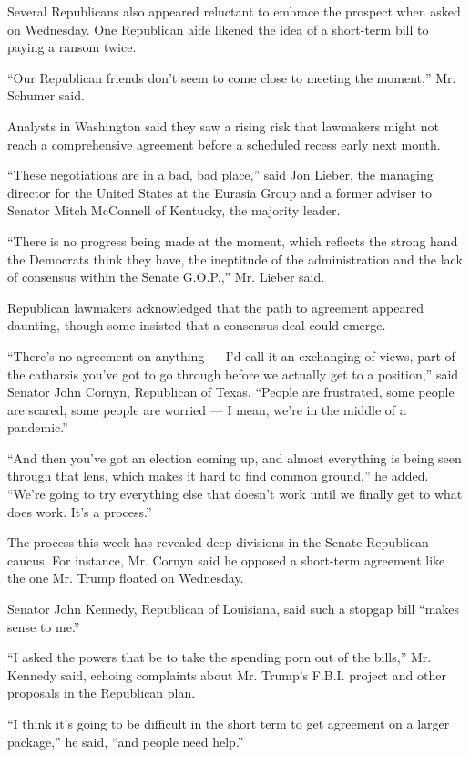 Several Republicans also appeared reluctant to embrace the prospect when
asked on Wednesday. One Republican aide likened the idea of a short-term
bill to paying a ransom twice.

``Our Republican friends don't seem to come close to meeting the
moment,'' Mr. Schumer said.

Analysts in Washington said they saw a rising risk that lawmakers might
not reach a comprehensive agreement before a scheduled recess early next
month.

``These negotiations are in a bad, bad place,'' said Jon Lieber, the
managing director for the United States at the Eurasia Group and a
former adviser to Senator Mitch McConnell of Kentucky, the majority
leader.

``There is no progress being made at the moment, which reflects the
strong hand the Democrats think they have, the ineptitude of the
administration and the lack of consensus within the Senate G.O.P.,'' Mr.
Lieber said.

Republican lawmakers acknowledged that the path to agreement appeared
daunting, though some insisted that a consensus deal could emerge.

``There's no agreement on anything --- I'd call it an exchanging of
views, part of the catharsis you've got to go through before we actually
get to a position,'' said Senator John Cornyn, Republican of Texas.
``People are frustrated, some people are scared, some people are worried
--- I mean, we're in the middle of a pandemic.''

``And then you've got an election coming up, and almost everything is
being seen through that lens, which makes it hard to find common
ground,'' he added. ``We're going to try everything else that doesn't
work until we finally get to what does work. It's a process.''

The process this week has revealed deep divisions in the Senate
Republican caucus. For instance, Mr. Cornyn said he opposed a short-term
agreement like the one Mr. Trump floated on Wednesday.

Senator John Kennedy, Republican of Louisiana, said such a stopgap bill
``makes sense to me.''

``I asked the powers that be to take the spending porn out of the
bills,'' Mr. Kennedy said, echoing complaints about Mr. Trump's F.B.I.
project and other proposals in the Republican plan.

``I think it's going to be difficult in the short term to get agreement
on a larger package,'' he said, ``and people need help.''

